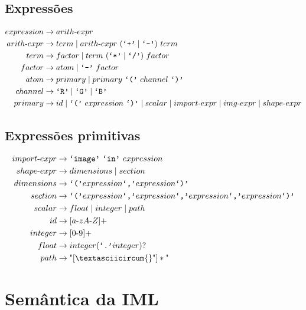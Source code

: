 \documentclass{article}
\newcommand{\literal}[1]{\text{\texttt{`#1'}}}
\newcommand{\tsp}{\text{ }}
\begin{document}
\subsection{Expressões}
\begin{align*}
expression &\rightarrow arith\text{-}expr\\
arith\text{-}expr &\rightarrow term \mid arith\text{-}expr \tsp (\literal{+} \mid \literal{-}) \tsp term\\
term &\rightarrow factor \mid term \tsp (\literal{*} \mid \literal{/}) \tsp factor\\
factor &\rightarrow atom \mid \literal{-} \tsp factor\\
atom &\rightarrow primary \mid primary \tsp \literal{(} \tsp channel \tsp \literal{)}\\
channel &\rightarrow \literal{R} \mid \literal{G} \mid \literal{B}\\
primary &\rightarrow id \mid \literal{(} \tsp expression \tsp \literal{)} \mid scalar \mid import\text{-}expr \mid img\text{-}expr \mid shape\text{-}expr\\
\end{align*}

\subsection{Expressões primitivas}
\label{sec:primitivas}
\begin{align*}
import\text{-}expr &\rightarrow \literal{image} \tsp \literal{in} \tsp expression\\
shape\text{-}expr &\rightarrow dimensions \mid section\\
dimensions &\rightarrow \literal{(} expression \literal{,} expression \literal{)}\\
section &\rightarrow \literal{(} expression \literal{,} expression \literal{,} expression \literal{,} expression \literal{)}\\
scalar &\rightarrow float \mid integer \mid path\\
id &\rightarrow [a\text{-}zA\text{-}Z]+\\
integer &\rightarrow [0\text{-}9]+\\
float &\rightarrow integer (\literal{.} integer)?\\
path &\rightarrow \text" [\textasciicircum{}\text"]* \text"
\end{align*}

\section{Semântica da IML}
\label{sec:semantica}
\end{document}
